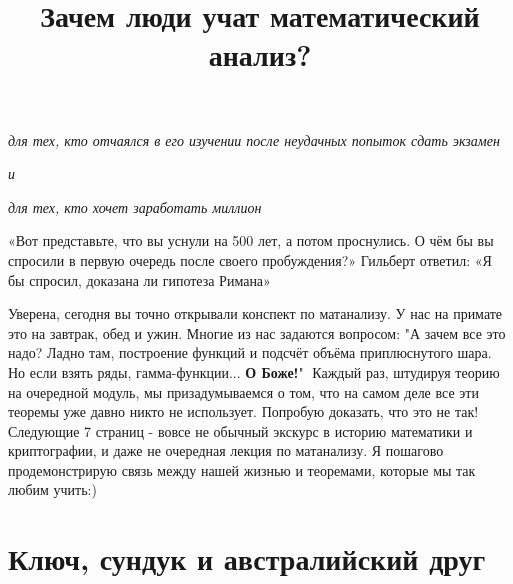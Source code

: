 

\date{}

\usepackage[dvipsnames]{xcolor}
\usepackage{colortbl}
\usepackage[dvips]{graphicx}
\graphicspath{{noiseimages/}}
\usepackage[utf8]{inputenc}
\usepackage{wrapfig}
\usepackage{subcaption}
\usepackage[normalem]{ulem} 

\usepackage[utf8]{inputenc}
\usepackage[english, ukrainian, russian]{babel}
\title {\textbf{Зачем люди учат математический анализ?}}
\author{}



\maketitle
\vspace{-50}
\begin{center}
 \small{\textit{для тех, кто отчаялся в его изучении после неудачных попыток сдать экзамен}}   
\end{center}
\begin{center}
 \small{\textit{и}}   
\end{center}
\begin{center}
 \small{\textit{для тех, кто хочет заработать миллион}}   
\end{center}
\vspace{45}

\setlength{\epigraphwidth}{0.4\textwidth}
\epigraph{«Вот представьте, что вы уснули на 500 лет, а потом проснулись. О чём бы вы спросили в первую очередь после своего пробуждения?» Гильберт ответил: «Я бы спросил, доказана ли гипотеза Римана»}{}


\hspace{20}Уверена, сегодня вы точно открывали конспект по матанализу. У нас на примате это на завтрак, обед и ужин. Многие из нас задаются вопросом: "А зачем все это надо? Ладно там, построение функций и подсчёт объёма приплюснутого шара. Но если взять ряды, гамма-функции...\textbf{ О Боже!}" $\;$Каждый раз, штудируя теорию на очередной модуль, мы призадумываемся о том, что на самом деле все эти теоремы уже давно никто не использует. Попробую доказать, что это не так! Следующие 7 страниц - вовсе не обычный экскурс в историю математики и криптографии, и даже не очередная лекция по матанализу. Я пошагово продемонстрирую связь между нашей жизнью и теоремами, которые мы так любим учить:) 

\section{Ключ, сундук и австралийский друг}

